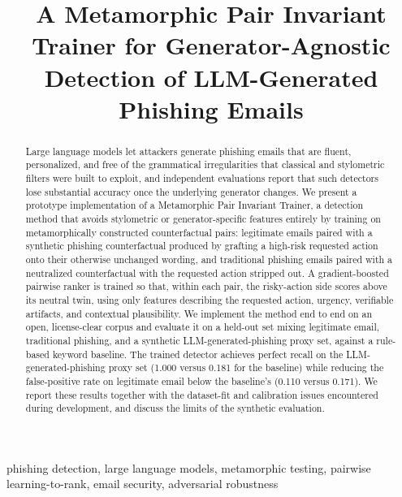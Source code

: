 \documentclass[conference]{IEEEtran}
\begin{document}
\title{A Metamorphic Pair Invariant Trainer for Generator-Agnostic Detection of LLM-Generated Phishing Emails}

\author{
}

\maketitle

\begin{abstract}
Large language models let attackers generate phishing emails that are fluent, personalized, and free of the grammatical irregularities that classical and stylometric filters were built to exploit, and independent evaluations report that such detectors lose substantial accuracy once the underlying generator changes. We present a prototype implementation of a Metamorphic Pair Invariant Trainer, a detection method that avoids stylometric or generator-specific features entirely by training on metamorphically constructed counterfactual pairs: legitimate emails paired with a synthetic phishing counterfactual produced by grafting a high-risk requested action onto their otherwise unchanged wording, and traditional phishing emails paired with a neutralized counterfactual with the requested action stripped out. A gradient-boosted pairwise ranker is trained so that, within each pair, the risky-action side scores above its neutral twin, using only features describing the requested action, urgency, verifiable artifacts, and contextual plausibility. We implement the method end to end on an open, license-clear corpus and evaluate it on a held-out set mixing legitimate email, traditional phishing, and a synthetic LLM-generated-phishing proxy set, against a rule-based keyword baseline. The trained detector achieves perfect recall on the LLM-generated-phishing proxy set (1.000 versus 0.181 for the baseline) while reducing the false-positive rate on legitimate email below the baseline's (0.110 versus 0.171). We report these results together with the dataset-fit and calibration issues encountered during development, and discuss the limits of the synthetic evaluation.
\end{abstract}

\begin{IEEEkeywords}
phishing detection, large language models, metamorphic testing, pairwise learning-to-rank, email security, adversarial robustness
\end{IEEEkeywords}
\end{document}
